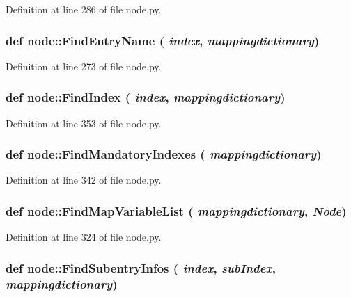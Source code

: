 Definition at line 286 of file node.py.\hypertarget{namespacenode_6f50edd49a143e12a1b6451678c126b9}{
\subsubsection[FindEntryName]{\setlength{\rightskip}{0pt plus 5cm}def node::Find\-Entry\-Name ( {\em index},  {\em mappingdictionary})}}
\label{namespacenode_6f50edd49a143e12a1b6451678c126b9}




Definition at line 273 of file node.py.\hypertarget{namespacenode_e87bc221d6720e73d680c1a187d14fa9}{
\subsubsection[FindIndex]{\setlength{\rightskip}{0pt plus 5cm}def node::Find\-Index ( {\em index},  {\em mappingdictionary})}}
\label{namespacenode_e87bc221d6720e73d680c1a187d14fa9}




Definition at line 353 of file node.py.\hypertarget{namespacenode_3538450156618ef27f500ca7cda2c401}{
\subsubsection[FindMandatoryIndexes]{\setlength{\rightskip}{0pt plus 5cm}def node::Find\-Mandatory\-Indexes ( {\em mappingdictionary})}}
\label{namespacenode_3538450156618ef27f500ca7cda2c401}




Definition at line 342 of file node.py.\hypertarget{namespacenode_3cabdb0f72121bc955d7dbd333a727b1}{
\subsubsection[FindMapVariableList]{\setlength{\rightskip}{0pt plus 5cm}def node::Find\-Map\-Variable\-List ( {\em mappingdictionary},  {\em Node})}}
\label{namespacenode_3cabdb0f72121bc955d7dbd333a727b1}




Definition at line 324 of file node.py.\hypertarget{namespacenode_c0fbae8b8d48542bb6018fe70275e652}{
\subsubsection[FindSubentryInfos]{\setlength{\rightskip}{0pt plus 5cm}def node::Find\-Subentry\-Infos ( {\em index},  {\em sub\-Index},  {\em mappingdictionary})}}
\label{namespacenode_c0fbae8b8d48542bb6018fe70275e652}




